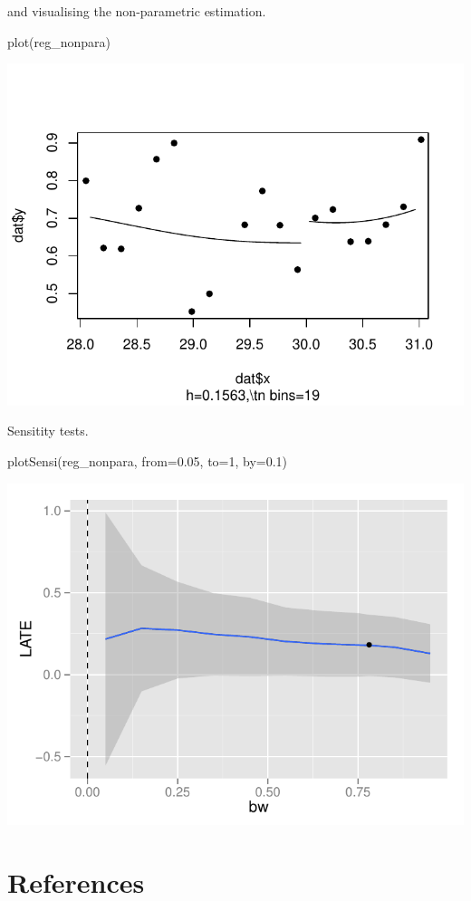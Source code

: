 \documentclass[article]{jss}
\begin{document}
and visualising the non-parametric estimation.

\begin{CodeChunk}
\begin{CodeInput}
plot(reg_nonpara)
\end{CodeInput}


\begin{center}\includegraphics{README_files/figure-latex/unnamed-chunk-11-1} \end{center}

\end{CodeChunk}

Sensitity tests.

\begin{CodeChunk}
\begin{CodeInput}
plotSensi(reg_nonpara, from=0.05, to=1, by=0.1)
\end{CodeInput}


\begin{center}\includegraphics{README_files/figure-latex/unnamed-chunk-12-1} \end{center}

\end{CodeChunk}

\section{References}\label{references}
\end{document}
